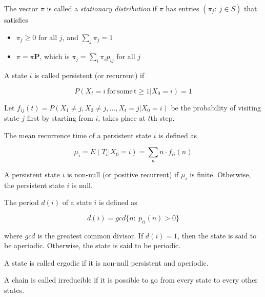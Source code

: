 \begin{defn}
\label{def:-The-vector}\citep[p.227]{grimmett2001probability} The
vector $\pi$ is called a \emph{stationary distribution} if $\pi$
has entries $(\pi_{j}:\:j\in S)$ that satisfies
\begin{itemize}
\item $\pi_{j}\geq0$ for all $j$, and $\sum_{j}\pi_{j}=1$
\item $\pi=\pi\mathbf{P}$, which is $\pi_{j}=\sum_{i}\pi_{i}p_{ij}$ for
all $j$
\end{itemize}
\end{defn}

\begin{defn}
\citep[p.220]{grimmett2001probability} A state $i$ is called persistent
(or recurrent) if

\[
P(X_{t}=i\mathrm{\:for\,}\mathrm{some\,\mathrm{t}}\geq1|X_{0}=i)=1
\]
\end{defn}

Let $f_{ij}(t)=P(X_{1}\neq j,X_{2}\neq j,...,X_{t}=j|X_{0}=i)$ be
the probability of visiting state $j$ first by starting from $i$,
takes place at $t$th step.

\begin{defn}
\citep[p.222]{grimmett2001probability} The mean recurrence time of
a persistent state $i$ is defined as

\[
\mu_{i}=E(T_{i}|X_{0}=i)=\sum_{n}n\cdot f_{ii}(n)
\]

A persistent state $i$ is non-null (or positive recurrent) if $\mu_{i}$
is finite. Otherwise, the persistent state $i$ is null. 
\end{defn}

\begin{defn}
\citep[p.222]{grimmett2001probability} The period $d(i)$ of a state
$i$ is defined as 

\[
d(i)=gcd\{n:\:p_{ii}(n)>0\}
\]

where $gcd$ is the greatest common divisor. If $d(i)=1$, then the
state is said to be aperiodic. Otherwise, the state is said to be
periodic. 
\end{defn}

\begin{defn}
\citep[p.222]{grimmett2001probability} A state is called ergodic
if it is non-null persistent and aperiodic.
\end{defn}

\begin{defn}
A chain is called irreducible if it is possible to go from every state
to every other states.
\end{defn}

